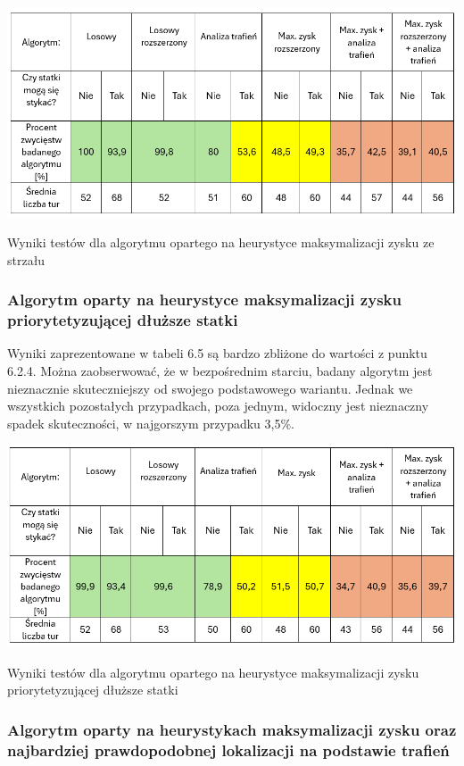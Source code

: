 \begin{table}[!h]
    \centering
    \includegraphics[width=1\linewidth]{img/table-location-heuristic.png}
    \caption{Wyniki testów dla algorytmu opartego na heurystyce maksymalizacji zysku ze strzału}
\end{table}


\subsubsection{Algorytm oparty na heurystyce maksymalizacji zysku priorytetyzującej dłuższe statki}

Wyniki zaprezentowane w tabeli 6.5 są bardzo zbliżone do wartości z punktu 6.2.4. Można zaobserwować, że w bezpośrednim starciu, badany algorytm jest nieznacznie skuteczniejszy od swojego podstawowego wariantu. Jednak we wszystkich pozostałych przypadkach, poza jednym, widoczny jest nieznaczny spadek skuteczności, w najgorszym przypadku 3,5\%.

\begin{table}[!h]
    \centering
    \includegraphics[width=1\linewidth]{img/table-location-heuristic-extended.png}
    \caption{Wyniki testów dla algorytmu opartego na heurystyce maksymalizacji zysku priorytetyzującej dłuższe statki}
\end{table}

\subsubsection{Algorytm oparty na heurystykach maksymalizacji zysku oraz najbardziej prawdopodobnej lokalizacji na podstawie trafień}

